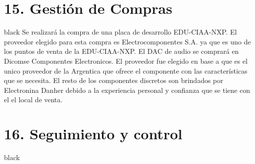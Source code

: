 \documentclass[11pt]{charter}
\begin{document}
\section{15. Gestión de Compras}
\label{sec:compras}

\begin{consigna}{black}
Se realizará la compra de una placa de desarrollo EDU-CIAA-NXP. El
proveedor elegido para esta compra es Electrocomponentes S.A. ya que es uno de los
puntos de venta de la EDU-CIAA-NXP.\newline 
El DAC de audio se comprará en Dicomse Componentes Electronicos. El proveedor fue elegido en base a que es el unico proveedor de la Argentica que ofrece el componente con las características que se necesita.\newline  
El resto de los componentes discretos son brindados por Electronina Danher debido a la experiencia personal y confianza que se tiene con el el local de venta.
\end{consigna}

\section{16. Seguimiento y control}
\label{sec:seguimiento}

\begin{consigna}{black}

\end{consigna}
\end{document}
